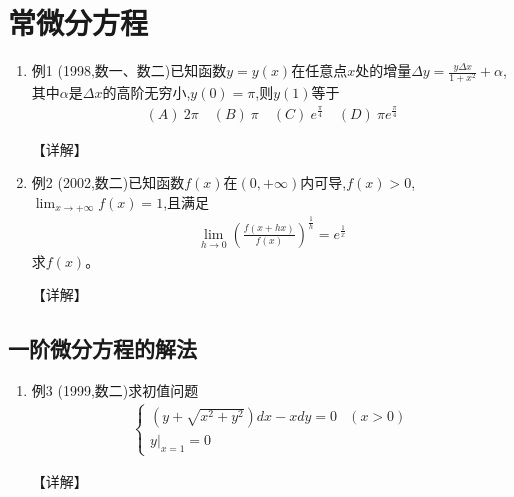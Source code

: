 \documentclass[12pt, a4paper, oneside, UTF8]{ctexbook}
\begin{document}
\section{常微分方程}
\begin{enumerate}[label=\arabic*.]
    \item 例1 (1998,数一、数二)已知函数$y=y(x)$在任意点$x$处的增量$\Delta y=\frac{y\Delta x}{1+x^2}+\alpha$,其中$\alpha$是$\Delta x$的高阶无穷小,$y(0)=\pi$,则$y(1)$等于
    \begin{align*}
        (A)\ 2\pi \quad (B)\ \pi \quad (C)\ e^{\frac{\pi}{4}} \quad (D)\ \pi e^{\frac{\pi}{4}}
    \end{align*}
    
    \begin{solution}
    【详解】
    \end{solution}
    
    \item 例2 (2002,数二)已知函数$f(x)$在$(0,+\infty)$内可导,$f(x)>0$,$\lim_{x\to+\infty}f(x)=1$,且满足
    \begin{align*}
        \lim_{h\to0}\left(\frac{f(x+hx)}{f(x)}\right)^{\frac{1}{h}}=e^{\frac{1}{x}}
    \end{align*}
    求$f(x)$。
    
    \begin{solution}
    【详解】
    \end{solution}
\end{enumerate}

\subsection{ 一阶微分方程的解法}

\begin{remark}
\end{remark}

\begin{enumerate}[label=\arabic*.,start=3]
    \item 例3 (1999,数二)求初值问题
    \begin{align*}
        \begin{cases}
            (y+\sqrt{x^2+y^2})dx-xdy=0 & (x>0) \\
            y|_{x=1}=0
        \end{cases}
    \end{align*}
    
    \begin{solution}
    【详解】
    \end{solution}
\end{enumerate}
\end{document}

